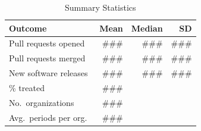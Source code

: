 \begin{table}[H]
  \centering
  \caption{Summary Statistics}
  \label{tab:outcome_summary}
\begin{tabular}{lrrr}
\toprule
Outcome & Mean & Median & SD \\
\midrule
Pull requests opened  & ### & ### & ### \\
Pull requests merged  & ### & ### & ### \\
New software releases & ### & ### & ### \\
\midrule
\% treated            & ### & & \\
No.\ organizations    & ### & & \\
Avg.\ periods per org.\ & ### & & \\
\bottomrule
\end{tabular}
\end{table}
